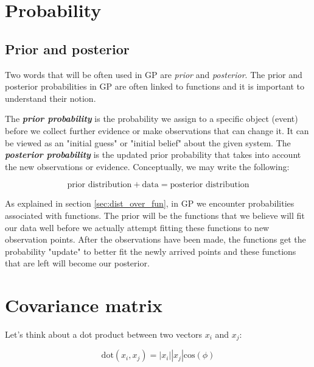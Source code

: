 \documentclass[10pt,twocolumn]{article}
\begin{document}
\section{Probability}

\subsection{Prior and posterior}

Two words that will be often used in GP are \textit{prior} and \textit{posterior}. The prior and posterior probabilities in GP are often linked to functions and it is important to understand their notion.

The \textbf{\textit{prior probability}} is the probability we assign to a specific object (event) before we collect further evidence or make observations that can change it. It can be viewed as an "initial guess" or "initial belief" about the given system. The \textbf{\textit{posterior probability}} is the updated prior probability that takes into account the new observations or evidence. Conceptually, we may write the following:

\begin{equation}
\text{prior distribution} + \text{data} = \text{posterior distribution}
\end{equation}

As explained in section \ref{sec:dist_over_fun}, in GP we encounter probabilities associated with functions. The prior will be the functions that we believe will fit our data well before we actually attempt fitting these functions to new observation points. After the observations have been made, the functions get the probability "update" to better fit the newly arrived points and these functions that are left will become our posterior.




\section{Covariance matrix}

Let's think about a dot product between two vectors $x_i$ and $x_j$:

\begin{equation}
\text{dot}(x_i, x_j) = |x_i| |x_j| \text{cos}(\phi)
\end{equation}
\end{document}

